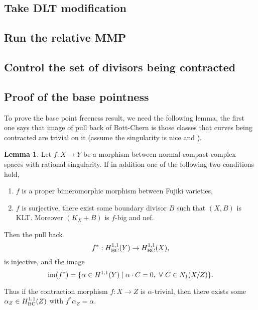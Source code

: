 \documentclass[11pt]{article}
\theoremstyle{definition}
\newtheorem{lemma}[theorem]{Lemma}
\begin{document}
	\subsection{Take DLT modification}
	
	\subsection{Run the relative MMP}
	
	\subsection{Control the set of divisors being contracted}
	
	\subsection{Proof of the base pointness}
	To prove the base point freeness result, we need the following lemma, the first one says that image of pull back of Bott-Chern is those classes that curves being contracted are trivial on it (assume the singularity is nice and ).
	\begin{lemma}\label{pullBC}
		Let $f:X\to Y$ be a morphism between normal compact complex spaces with rational singularity. If in addition one of the following two conditions hold,
		\begin{enumerate}
			\item $f$ is a proper bimeromorphic morphism between Fujiki varieties,
			\item $f$ is surjective, there exist some boundary divisor $B$ such that $(X,B)$ is KLT. Moreover $(K_X+B)$ is $f$-big and nef.
		\end{enumerate}
		Then the pull back $$f^* : H^{1,1}_{\rm{BC}}(Y) \to H^{1,1}_{\rm{BC}}(X),$$is injective, and the image $${\rm{im}}(f^*) = \{\alpha \in H^{1,1}_{\rm}(Y)\mid \alpha \cdot C = 0,\  \forall\ C\in N_1(X/Z)\}.$$
	\end{lemma}
	Thus if the contraction morphism $f:X\to Z$ is $\alpha$-trivial, then there exists some $\alpha_Z \in H^{1,1}_{\rm{BC}}(Z)$ with $f^* \alpha_Z = \alpha$.
	
\end{document}
